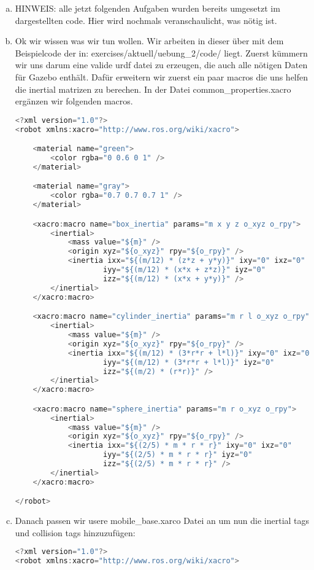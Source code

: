\documentclass[a4paper,12pt]{article}
\begin{document}
\begin{enumerate}[a)]
\item{HINWEIS: alle jetzt folgenden Aufgaben wurden bereits umgesetzt im dargestellten code. Hier wird nochmals veranschaulicht, was nötig ist.}
\item{
Ok wir wissen was wir tun wollen. Wir arbeiten in dieser über mit dem Beispielcode der in: exercises/aktuell/uebung\_2/code/ liegt. Zuerst kümmern wir uns darum eine valide urdf datei zu erzeugen, die auch alle nötigen Daten für Gazebo enthält. Dafür erweitern wir zuerst ein paar macros die uns helfen die inertial matrizen zu berechen. In der Datei common\_properties.xacro  ergänzen wir folgenden macros.

\begin{lstlisting}[language=C++,basicstyle=\fontsize{6.5}{8}\selectfont]
<?xml version="1.0"?>
<robot xmlns:xacro="http://www.ros.org/wiki/xacro">

    <material name="green">
        <color rgba="0 0.6 0 1" />
    </material>

    <material name="gray">
        <color rgba="0.7 0.7 0.7 1" />
    </material>

    <xacro:macro name="box_inertia" params="m x y z o_xyz o_rpy">
        <inertial>
            <mass value="${m}" />
            <origin xyz="${o_xyz}" rpy="${o_rpy}" />
            <inertia ixx="${(m/12) * (z*z + y*y)}" ixy="0" ixz="0"
                    iyy="${(m/12) * (x*x + z*z)}" iyz="0"
                    izz="${(m/12) * (x*x + y*y)}" />
        </inertial>
    </xacro:macro>

    <xacro:macro name="cylinder_inertia" params="m r l o_xyz o_rpy">
        <inertial>
            <mass value="${m}" />
            <origin xyz="${o_xyz}" rpy="${o_rpy}" />
            <inertia ixx="${(m/12) * (3*r*r + l*l)}" ixy="0" ixz="0"
                    iyy="${(m/12) * (3*r*r + l*l)}" iyz="0"
                    izz="${(m/2) * (r*r)}" />
        </inertial>
    </xacro:macro>

    <xacro:macro name="sphere_inertia" params="m r o_xyz o_rpy">
        <inertial>
            <mass value="${m}" />
            <origin xyz="${o_xyz}" rpy="${o_rpy}" />
            <inertia ixx="${(2/5) * m * r * r}" ixy="0" ixz="0"
                    iyy="${(2/5) * m * r * r}" iyz="0"
                    izz="${(2/5) * m * r * r}" />
        </inertial>
    </xacro:macro>

</robot>
\end{lstlisting}
}
\item{
Danach passen wir usere mobile\_base.xarco Datei an um nun die inertial tags und collision tags hinzuzufügen:
\begin{lstlisting}[language=C++,basicstyle=\fontsize{6.5}{8}\selectfont]
<?xml version="1.0"?>
<robot xmlns:xacro="http://www.ros.org/wiki/xacro">


\end{lstlisting}}
\end{enumerate}
\end{document}
